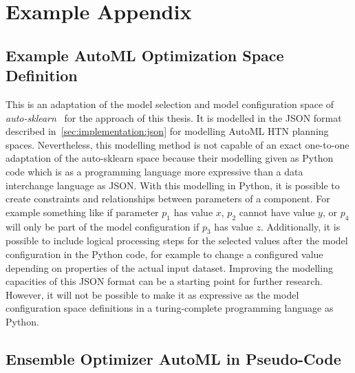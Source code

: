 %
\chapter{Example Appendix}
\label{sec:appendix}

\Blindtext[1][1]

\section{Example AutoML Optimization Space Definition}
\label{sec:appendix:htn-space}
This is an adaptation of the model selection and model configuration space of \textit{auto-sklearn}~\cite{Feurer-AutoSklearn} for the approach of this thesis.
It is modelled in the JSON format described in~\ref{sec:implementation:json} for modelling AutoML HTN planning spaces.\newline
Nevertheless, this modelling method is not capable of an exact one-to-one adaptation of the auto-sklearn space because their modelling given as Python code which is as a programming language more expressive than a data interchange language as JSON.
With this modelling in Python, it is possible to create constraints and relationships between parameters of a component.
For example something like if parameter $p_1$ has value $x$, $p_2$ cannot have value $y$, or $p_4$ will only be part of the model configuration if $p_3$ has value $z$.
Additionally, it is possible to include logical processing steps for the selected values after the model configuration in the Python code, for example to change a configured value depending on properties of the actual input dataset.\newline
Improving the modelling capacities of this JSON format can be a starting point for further research.
However, it will not be possible to make it as expressive as the model configuration space definitions in a turing-complete programming language as Python.

\Blindtext[1][1]

\section{Ensemble Optimizer AutoML in Pseudo-Code}
\label{sec:appendix:pseudo-code}

\Blindtext[1][1]

